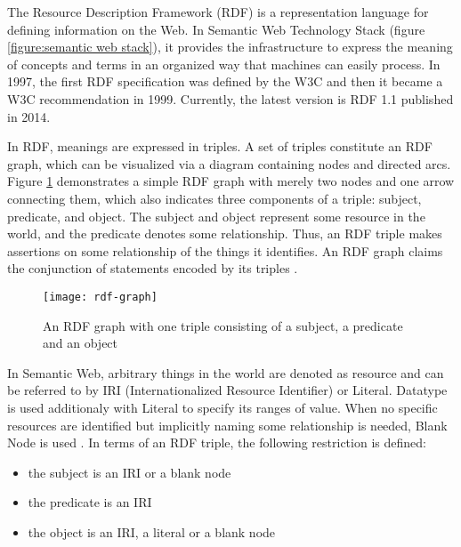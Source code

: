 The Resource Description Framework (RDF) is a representation language for defining information on the Web. In Semantic Web Technology Stack (figure \ref{figure:semantic web stack}), it provides the infrastructure to express the meaning of concepts and terms in an organized way that machines can easily process. In 1997, the first RDF specification was defined by the W3C and then it became a W3C recommendation in 1999. Currently, the latest version is RDF 1.1 \cite{Cyganiak2014} published in 2014.

In RDF, meanings are expressed in triples. A set of triples constitute an RDF graph, which can be visualized via a diagram containing nodes and directed arcs. Figure \ref{figure:rdf example} demonstrates a simple RDF graph with merely two nodes and one arrow connecting them, which also indicates three components of a triple: subject, predicate, and object. The subject and object represent some resource in the world, and the predicate denotes some relationship. Thus, an RDF triple makes assertions on some relationship of the things it identifies. An RDF graph claims the conjunction of statements encoded by its triples \cite{Cyganiak2014}.

\begin{figure}[h]
\texttt{[image: rdf-graph]}
\centering
\caption{An RDF graph with one triple consisting of a subject, a predicate and an object}
\label{figure:rdf example}
\end{figure}

In Semantic Web, arbitrary things in the world are denoted as resource and can be referred to by IRI (Internationalized Resource Identifier) or Literal. Datatype is used additionaly with Literal to specify its ranges of value. When no specific resources are identified but implicitly naming some relationship is needed, Blank Node is used \cite{Cyganiak2014}. In terms of an RDF triple, the following restriction is defined: 
\medskip
\begin{itemize}
\item the subject is an IRI or a blank node
\item the predicate is an IRI
\item the object is an IRI, a literal or a blank node
\end{itemize}

